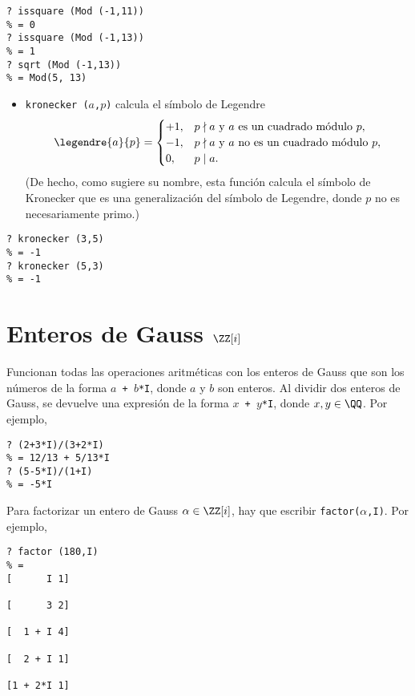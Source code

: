 \begin{framed}\footnotesize
\begin{verbatim}
? issquare (Mod (-1,11))
% = 0
? issquare (Mod (-1,13))
% = 1
? sqrt (Mod (-1,13))
% = Mod(5, 13)
\end{verbatim}
\end{framed}

\begin{itemize}
\item \texttt{kronecker\,($a$,$p$)} calcula el símbolo de Legendre
  \[ \legendre{a}{p} = \begin{cases}
    +1, & p\nmid a\text{ y }a\text{ es un cuadrado módulo }p,\\
    -1, & p\nmid a\text{ y }a\text{ no es un cuadrado módulo }p,\\
    0, & p\mid a.
  \end{cases} \]
(De hecho, como sugiere su nombre, esta función calcula el símbolo de Kronecker
que es una generalización del símbolo de Legendre, donde $p$ no es
necesariamente primo.)
\end{itemize}

\begin{framed}\footnotesize
\begin{verbatim}
? kronecker (3,5)
% = -1
? kronecker (5,3)
% = -1
\end{verbatim}
\end{framed}


\section{Enteros de Gauss $\ZZ [i]$}

Funcionan todas las operaciones aritméticas con los enteros de Gauss que son
los números de la forma \texttt{$a$ + $b$*I}, donde $a$ y $b$ son enteros.
Al dividir dos enteros de Gauss, se devuelve una expresión de la forma
\texttt{$x$ + $y$*I}, donde $x,y\in\QQ$. Por ejemplo,
\begin{framed}\footnotesize
\begin{verbatim}
? (2+3*I)/(3+2*I)
% = 12/13 + 5/13*I
? (5-5*I)/(1+I)
% = -5*I
\end{verbatim}
\end{framed}

Para factorizar un entero de Gauss $\alpha \in \ZZ [i]$, hay que escribir
\texttt{factor($\alpha$,I)}. Por ejemplo,

\begin{framed}\footnotesize
\begin{verbatim}
? factor (180,I)
% = 
[      I 1]

[      3 2]

[  1 + I 4]

[  2 + I 1]

[1 + 2*I 1]
\end{verbatim}
\end{framed}

